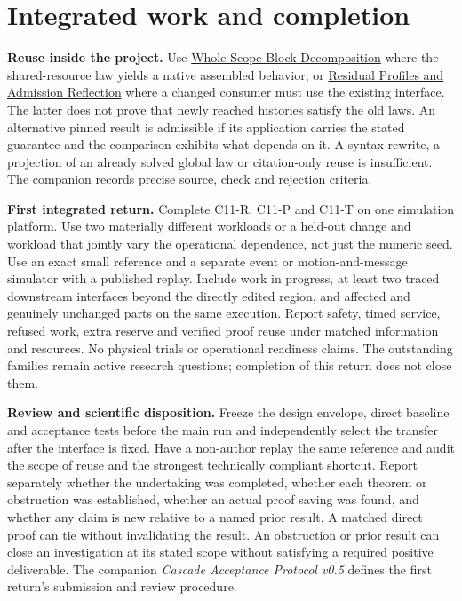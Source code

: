 \documentclass[11pt]{article}
\begin{document}
\section{Integrated work and completion}
\textbf{Reuse inside the project.} Use \href{https://github.com/eternal-november/eos-research-programmes/blob/e1348964f73704212d2d8b48d5982a5ed600a2ff/projects/contextual-composition/foundations/shared-world-native-assembly/Whole_Scope_Block_Decomposition.tex#L31-L51}{Whole Scope Block Decomposition} where the shared-resource law yields a native assembled behavior, or \href{https://github.com/eternal-november/eos-research-programmes/blob/e1348964f73704212d2d8b48d5982a5ed600a2ff/projects/contextual-composition/feedback-and-concurrency/observable-covers/Residual_Profiles_and_Admission_Reflection.tex#L84-L101}{Residual Profiles and Admission Reflection} where a changed consumer must use the existing interface. The latter does not prove that newly reached histories satisfy the old laws. An alternative pinned result is admissible if its application carries the stated guarantee and the comparison exhibits what depends on it. A syntax rewrite, a projection of an already solved global law or citation-only reuse is insufficient. The companion records precise source, check and rejection criteria.

\textbf{First integrated return.} Complete C11-R, C11-P and C11-T on one simulation platform. Use two materially different workloads or a held-out change and workload that jointly vary the operational dependence, not just the numeric seed. Use an exact small reference and a separate event or motion-and-message simulator with a published replay. Include work in progress, at least two traced downstream interfaces beyond the directly edited region, and affected and genuinely unchanged parts on the same execution. Report safety, timed service, refused work, extra reserve and verified proof reuse under matched information and resources. No physical trials or operational readiness claims. The outstanding families remain active research questions; completion of this return does not close them.

\textbf{Review and scientific disposition.} Freeze the design envelope, direct baseline and acceptance tests before the main run and independently select the transfer after the interface is fixed. Have a non-author replay the same reference and audit the scope of reuse and the strongest technically compliant shortcut. Report separately whether the undertaking was completed, whether each theorem or obstruction was established, whether an actual proof saving was found, and whether any claim is new relative to a named prior result. A matched direct proof can tie without invalidating the result. An obstruction or prior result can close an investigation at its stated scope without satisfying a required positive deliverable. The companion \emph{Cascade Acceptance Protocol v0.5} defines the first return's submission and review procedure.
\end{document}
